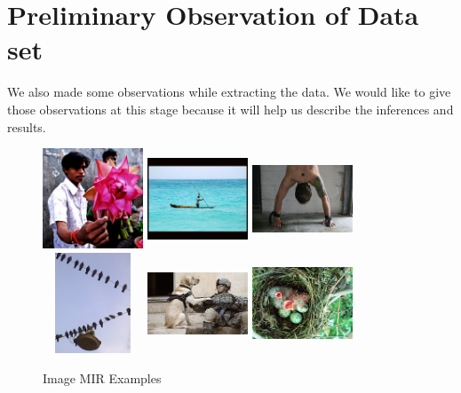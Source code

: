 \section{Preliminary Observation of Data set}
We also made some observations while extracting the data. We would like to
give those observations at this stage because it will help us
describe the inferences and results.
\begin{center}
\begin{figure}
\centering
\includegraphics[width=3cm, height=3cm]{./Pictures/MIR/1.jpg}
\includegraphics[width=3cm, height=3cm]{./Pictures/MIR/2.jpg}
\includegraphics[width=3cm, height=3cm]{./Pictures/MIR/3.jpg} \\
\includegraphics[width=3cm, height=3cm]{./Pictures/MIR/4.jpg}
\includegraphics[width=3cm, height=3cm]{./Pictures/MIR/5.jpg}
\includegraphics[width=3cm, height=3cm]{./Pictures/MIR/6.jpg}
\caption{Image MIR Examples}
\label{fig:Image MIR Examples}
\end{figure}
\end{center}
